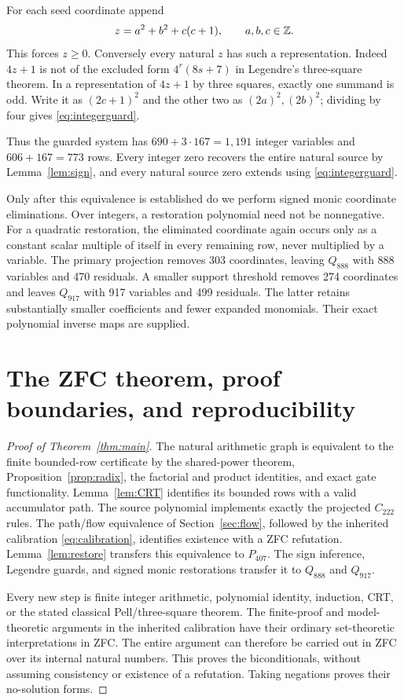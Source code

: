 \documentclass[10pt,letterpaper]{article}
\theoremstyle{definition}\newtheorem{definition}[theorem]{Definition}
\theoremstyle{remark}\newtheorem{remark}[theorem]{Remark}
\newcommand{\Pn}{P_{407}}\newcommand{\Pz}{Q_{888}}\newcommand{\Ps}{Q_{917}}
\begin{document}
For each seed coordinate append
\begin{equation}\label{eq:integerguard}
 z=a^2+b^2+c(c+1),\qquad a,b,c\in\mathbb Z.
\end{equation}
This forces $z\ge0$. Conversely every natural $z$ has such a representation.
Indeed $4z+1$ is not of the excluded form $4^r(8s+7)$ in Legendre's
three-square theorem. In a representation of $4z+1$ by three squares,
exactly one summand is odd. Write it as $(2c+1)^2$ and the other two
as $(2a)^2,(2b)^2$; dividing by four gives \eqref{eq:integerguard}.

Thus the guarded system has $690+3\cdot167=1,191$ integer variables and
$606+167=773$ rows. Every integer zero recovers the entire natural
source by Lemma~\ref{lem:sign}, and every natural source zero extends
using \eqref{eq:integerguard}.

Only after this equivalence is established do we perform signed monic
coordinate eliminations. Over integers, a restoration polynomial need not
be nonnegative. For a quadratic restoration, the eliminated coordinate
again occurs only as a constant scalar multiple of itself in every
remaining row, never multiplied by a variable.
The primary projection removes 303 coordinates, leaving $\Pz$ with
888 variables and 470 residuals. A smaller support threshold removes
274 coordinates and leaves $\Ps$ with 917 variables and 499 residuals.
The latter retains substantially smaller coefficients and fewer expanded
monomials. Their exact polynomial inverse maps are supplied.

\section{The ZFC theorem, proof boundaries, and reproducibility}
\label{sec:validation}

\begin{proof}[Proof of Theorem~\ref{thm:main}]
The natural arithmetic graph is equivalent to the finite bounded-row
certificate by the shared-power theorem, Proposition~\ref{prop:radix},
the factorial and product identities, and exact gate functionality.
Lemma~\ref{lem:CRT} identifies its bounded rows with a valid accumulator
path. The source polynomial implements exactly the projected $C_{222}$
rules. The path/flow equivalence of Section~\ref{sec:flow}, followed by
the inherited calibration \eqref{eq:calibration}, identifies existence
with a ZFC refutation. Lemma~\ref{lem:restore} transfers this equivalence
to $\Pn$. The sign inference, Legendre guards, and signed monic
restorations transfer it to $\Pz$ and $\Ps$.

Every new step is finite integer arithmetic, polynomial identity,
induction, CRT, or the stated classical Pell/three-square theorem.
The finite-proof and model-theoretic arguments in the inherited
calibration have their ordinary set-theoretic interpretations in ZFC.
The entire argument can therefore be carried out in ZFC over its internal
natural numbers. This proves the biconditionals, without assuming
consistency or existence of a refutation. Taking negations proves their
no-solution forms.
\end{proof}
\end{document}

